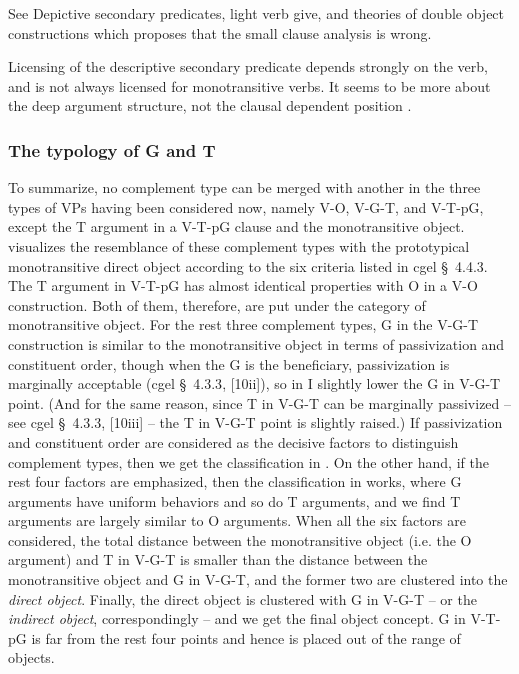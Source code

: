 \documentclass[UTF8, a4paper, oneside, scheme=plain, 12pt]{ctexbook}
\newcommand*{\citesec}[1]{\S~{#1}}
\newcommand*{\term}[1]{\emph{#1}}
\begin{document}
See Depictive secondary predicates, light verb give, and theories of double object constructions which proposes that the small clause analysis is wrong.

Licensing of the descriptive secondary predicate depends strongly on the verb, 
and is not always licensed for monotransitive verbs.
It seems to be more about the deep argument structure, 
not the clausal dependent position \citep{maling2001dative}.

\subsubsection{The typology of G and T}\label{sec:g-t-typology}

To summarize, no complement type can be merged with another  
in the three types of VPs having been considered now,
namely V-O, V-G-T, and V-T-pG,
except the T argument in a V-T-pG clause and the monotransitive object.
 visualizes the resemblance 
of these complement types with the prototypical monotransitive direct object 
according to the six criteria listed in \ac{cgel} \citesec{4.4.3}.
The T argument in V-T-pG has almost identical properties
with O in a V-O construction.
Both of them, therefore, are put under the category of monotransitive object.
For the rest three complement types,
G in the V-G-T construction is similar to the monotransitive object 
in terms of passivization and constituent order,
though when the G is the beneficiary,
passivization is marginally acceptable (\ac{cgel} \citesec{4.3.3}, [10ii]),
so in  I slightly lower the G in V-G-T point.
(And for the same reason, since T in V-G-T can be marginally passivized 
-- see \ac{cgel} \citesec{4.3.3}, [10iii] --
the T in V-G-T point is slightly raised.)
If passivization and constituent order are considered as the decisive factors to distinguish complement types,
then we get the classification in .
On the other hand, if the rest four factors are emphasized,
then the classification in  works,
where G arguments have uniform behaviors 
and so do T arguments,
and we find T arguments are largely similar to O arguments.
When all the six factors are considered,
the total distance between the monotransitive object (i.e. the O argument)
and T in V-G-T is smaller than 
the distance between the monotransitive object and G in V-G-T,
and the former two are clustered into the \term{direct object}.
Finally, the direct object is clustered with G in V-G-T 
-- or the \term{indirect object}, correspondingly -- 
and we get the final object concept.
G in V-T-pG is far from the rest four points 
and hence is placed out of the range of objects.
\end{document}
